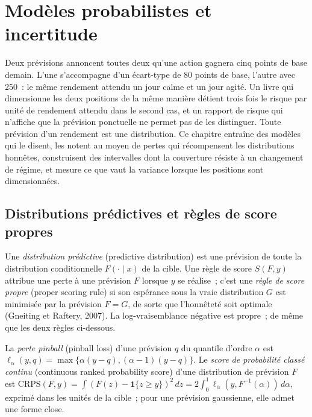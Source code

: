\chapter{Modèles probabilistes et incertitude}\label{ch:ml:probabilistic-models-and-uncertainty}

Deux prévisions annoncent toutes deux qu'une action gagnera cinq points de base demain. L'une s'accompagne d'un écart-type de 80
points de base, l'autre avec 250~: le même rendement attendu un jour calme et un jour agité. Un livre qui dimensionne les deux
positions de la même manière détient trois fois le risque par unité de rendement attendu dans le second cas, et un rapport de risque qui n'affiche que
la prévision ponctuelle ne permet pas de les distinguer. Toute prévision d'un rendement est une distribution. Ce chapitre entraîne des modèles
qui le disent, les notent au moyen de pertes qui récompensent les distributions honnêtes, construisent des intervalles dont la couverture résiste à un
changement de régime, et mesure ce que vaut la variance lorsque les positions sont dimensionnées.

\section{Distributions prédictives et règles de score propres}

\begin{definition}\label{def:ml:probabilistic-models-and-uncertainty:scoring}
Une \emph{distribution prédictive} (predictive distribution) est une prévision de toute la distribution conditionnelle
$F(\cdot\mid x)$ de la cible. Une règle de score $S(F, y)$ attribue une perte à une prévision $F$ lorsque $y$ se réalise~; c'est une
\emph{règle de score propre} (proper scoring rule) si son espérance sous la vraie distribution $G$ est minimisée
par la prévision $F = G$, de sorte que l'honnêteté soit optimale (Gneiting et Raftery, 2007). La log-vraisemblance négative est propre~;
de même que les deux règles ci-dessous.
\end{definition}

\begin{definition}\label{def:ml:probabilistic-models-and-uncertainty:crps}
La \emph{perte pinball} (pinball loss) d'une prévision $q$ du quantile d'ordre $\alpha$ est
$\ell_\alpha(y, q) = \max\{\alpha(y - q), (\alpha - 1)(y - q)\}$. Le
\emph{score de probabilité classé continu} (continuous ranked probability score) d'une distribution de prévision $F$ est
$\mathrm{CRPS}(F, y) = \int(F(z) - \mathbf 1\{z\ge y\})^2\,dz = 2\int_0^1\ell_\alpha(y, F^{-1}(\alpha))\,d\alpha$, exprimé dans les
unités de la cible~; pour une prévision gaussienne, elle admet une forme close.
\end{definition}

